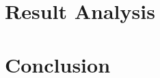\documentclass[Times,12pt,oneside,openany,print,index]{report}
\let\cleardoublepage=\clearpage %
\begin{document}
\chapter{Result Analysis}
\label{ch:results}


\chapter{Conclusion}
\label{ch:conclusion}


\cleardoublepage
{}
\printbibliography[heading=bibintoc, title={Bibliography}]

\appendix








\end{document}

